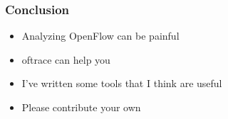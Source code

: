 \documentclass[14pt]{beamer}
\begin{document}
\begin{frame}
\frametitle{Conclusion}
\begin{itemize}
\item Analyzing OpenFlow can be painful
\item oftrace can help you
\item I've written some tools that I think are useful
\item Please contribute your own
\end{itemize}
\end{frame}
\end{document}
